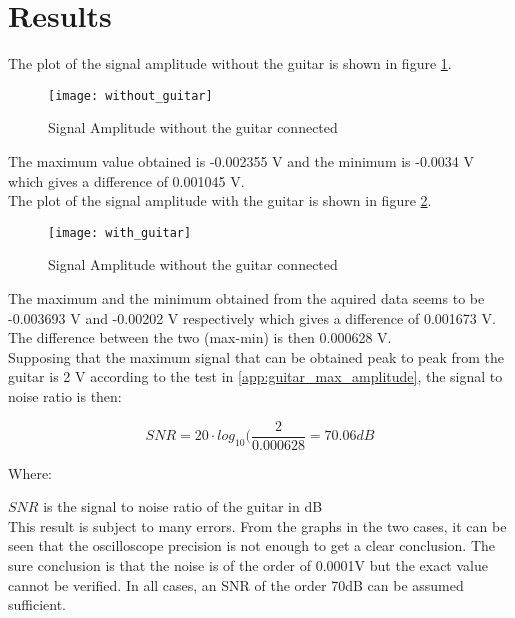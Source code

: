 \section{Results}

The plot of the signal amplitude without the guitar is shown in figure \ref{fig:without_guitar}. \\

\begin{figure}[hbt]
  \centering
  \texttt{[image: without\_guitar]}
  \caption{Signal Amplitude without the guitar connected}
  \label{fig:without_guitar}
\end{figure}

The maximum value obtained is -0.002355 V and the minimum is -0.0034 V which gives a difference of 0.001045 V. \\

The plot of the signal amplitude with the guitar is shown in figure \ref{fig:with_guitar}. \\

\begin{figure}[hbt]
  \centering
  \texttt{[image: with\_guitar]}
  \caption{Signal Amplitude without the guitar connected}
  \label{fig:with_guitar}
\end{figure}

The maximum and the minimum obtained from the aquired data seems to be -0.003693 V and -0.00202 V respectively which gives a difference of 0.001673 V.  \\
The difference between the two (max-min) is then 0.000628 V. \\
Supposing that the maximum signal that can be obtained peak to peak from the guitar is 2 V according to the test in \autoref{app:guitar_max_amplitude}, the signal to noise ratio is then:

\begin{equation}
	SNR = 20 \cdot log_{10}(\frac{2}{0.000628} = 70.06dB
	\end{equation}

Where:

$SNR$ is the signal to noise ratio of the guitar in dB \\


This result is subject to many errors. From the graphs in the two cases, it can be seen that the oscilloscope precision is not enough to get a clear conclusion. The sure conclusion is that the noise is of the order of 0.0001V but the exact value cannot be verified. In all cases, an SNR of the order 70dB can be assumed sufficient.